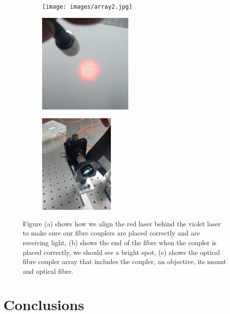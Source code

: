 \documentclass[12pt]{book}
\begin{document}
\begin{figure}[t!]
\centering
\begin{subfigure}[b]{0.3\linewidth}
\texttt{[image: images/array2.jpg]}
\caption{}
\end{subfigure}
\begin{subfigure}[b]{0.3\linewidth}
\includegraphics[width=\linewidth,height=5cm]{images/outfibre.jpg}
\caption{}
\end{subfigure}
\begin{subfigure}[b]{0.3\linewidth}
\includegraphics[width=\linewidth,height=5cm]{images/fibre.jpg}
\caption{}
\end{subfigure}
\caption{Figure (a) shows how we align the red laser behind the violet laser to make sure our fibre couplers are placed correctly and are receiving light, (b) shows the end of the fibre when the coupler is placed correctly, we should see a bright spot, (c) shows the optical fibre coupler array that includes the coupler, an objective, its mount and optical fibre.}
\label{fig:coupler}
\end{figure}

\pagebreak

 
\chapter{Conclusions}
\thispagestyle{plain}

\pagebreak
{}




\end{document}
